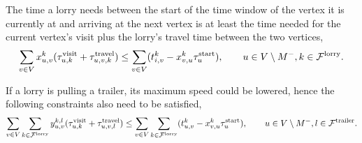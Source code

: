 The time a lorry needs  between the start of the time window of the vertex it is currently at and arriving at the next vertex is at least the time needed for the current vertex's visit plus the lorry's travel time between the two vertices,
\begin{align}
  \sum_{v \in V} x_{u,v}^k (\tau_{u,k}^{\rm visit} + \tau_{u,v,k}^{\rm travel}) \leq \sum_{v \in V} (t_{i,v}^k - x^k_{v,u} \tau_u^{\rm start}),
  \qquad u\in V \setminus M^- , k \in \mathcal{F}^{\rm lorry}.
\end{align}




If a lorry is pulling a trailer, its maximum speed could be lowered, hence the following constraints also need to be satisfied,
\begin{align}
  \label{eq:time-hard-last}
  \sum_{v \in V} \sum_{k \in \mathcal F^{\rm lorry}} y^{k,l}_{u,v} (\tau_{u,k}^{\rm visit} + \tau_{u,v,l}^{\rm travel}) \leq \sum_{v \in V} \sum_{k \in \mathcal F^{\rm lorry}} (t_{u,v}^k - x^k_{v,u} \tau_u^{\rm start}),
  \qquad u\in V \setminus M^- , l \in \mathcal F^{\rm trailer}.
\end{align}


%










